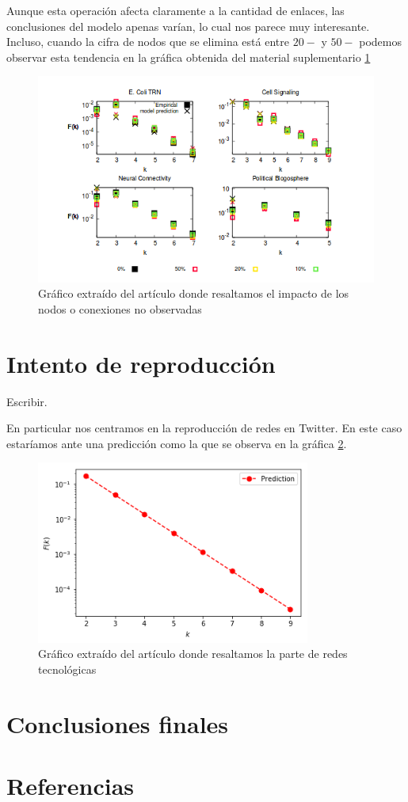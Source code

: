 \documentclass[1p]{elsarticle}
\begin{document}
Aunque esta operación afecta claramente a la cantidad de enlaces, las conclusiones del modelo apenas varían, lo cual nos parece muy interesante. Incluso, cuando la cifra de nodos que se elimina está entre $20-$ y $50-$ podemos observar esta tendencia en la gráfica obtenida del material suplementario \ref{h4}
\begin{figure}
	\centering
	\includegraphics[width=15cm]{graf_3.png}
	\caption{Gráfico extraído del artículo donde resaltamos el impacto de los nodos o conexiones no observadas}
	\label{h4}
\end{figure}

\section{Intento de reproducción}

Escribir.

En particular nos centramos en la reproducción de redes en Twitter. En este caso estaríamos ante una predicción como la que se observa en la gráfica \ref{h2}.
\begin{figure}
	\centering
	\includegraphics[width=9cm]{graf_4.png}
	\caption{Gráfico extraído del artículo donde resaltamos la parte de redes tecnológicas}
	\label{h2}
\end{figure}

\section{Conclusiones finales}
\section*{Referencias}

\end{document}
